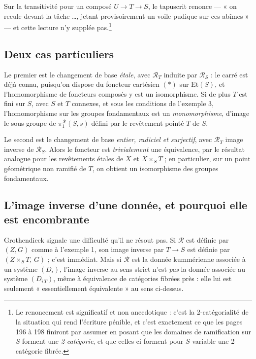 \documentclass[11pt,a4paper]{article}
\begin{document}
Sur la transitivité pour un composé $U \to T \to S$, le tapuscrit renonce ---
« on recule devant la tâche \dots , jetant provisoirement un voile pudique sur
ces abîmes » --- et cette lecture n'y supplée pas.\footnote{Le renoncement est
significatif et non anecdotique : c'est la 2-catégorialité de la situation qui
rend l'écriture pénible, et c'est exactement ce que les pages 196 à 198
finiront par assumer en posant que les domaines de ramification sur $S$ forment
une \emph{2-catégorie}, et que celles-ci forment pour $S$ variable une
2-catégorie fibrée.}

\subsection*{Deux cas particuliers}

Le premier est le changement de base \emph{étale}, avec $\mathcal{R}_{T}$
induite par $\mathcal{R}_{S}$ : le carré est déjà connu, puisqu'on dispose du
foncteur cartésien $(\ast)$ sur $\mathrm{Et}(S)$, et l'homomorphisme de
foncteurs composés y est un isomorphisme. Si de plus $T$ est fini sur $S$, avec
$S$ et $T$ connexes, et sous les conditions de l'exemple 3, l'homomorphisme sur
les groupes fondamentaux est un \emph{monomorphisme}, d'image le sous-groupe de
$\pi_{1}^{\mathcal{R}}(S,s)$ défini par le revêtement pointé $T$ de $S$.

Le second est le changement de base \emph{entier, radiciel et surjectif}, avec
$\mathcal{R}_{T}$ image inverse de $\mathcal{R}_{S}$. Alors le foncteur est
\emph{trivialement} une équivalence, par le résultat analogue pour les
revêtements étales de $X$ et $X \times_{S} T$ ; en particulier, sur un point
géométrique non ramifié de $T$, on obtient un isomorphisme des groupes
fondamentaux.

\subsection*{L'image inverse d'une donnée, et pourquoi elle est encombrante}

Grothendieck signale une difficulté qu'il ne résout pas. Si $\mathcal{R}$ est
définie par $(Z,G)$ comme à l'exemple 1, son image inverse par $T \to S$ est
définie par $(Z \times_{S} T,\, G)$ ; c'est immédiat. Mais si $\mathcal{R}$ est
la donnée kummérienne associée à un système $(D_{i})$, l'image inverse au sens
strict n'est \emph{pas} la donnée associée au système $(D_{i\,T})$, même à
équivalence de catégories fibrées près : elle lui est seulement
« essentiellement équivalente » au sens ci-dessus.
\end{document}
